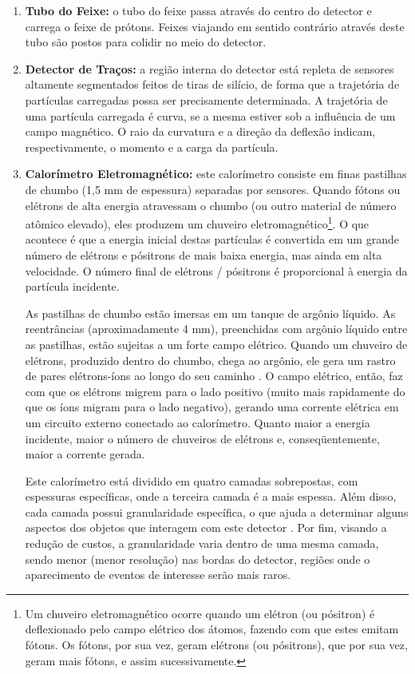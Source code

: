 \begin{enumerate}

\item \textbf{Tubo do Feixe:} o tubo do feixe passa através do centro do detector e carrega o feixe de prótons. Feixes viajando em sentido contrário através deste tubo são postos para colidir no meio do detector.

\item \textbf{Detector de Traços:} a região interna do detector está repleta de sensores altamente segmentados feitos de tiras de silício, de forma que a trajetória de partículas carregadas possa ser precisamente determinada. A trajetória de uma partícula carregada é curva, se a mesma estiver sob a influência de um campo magnético. O raio da curvatura e a direção da deflexão indicam, respectivamente, o momento e a carga da partícula.

\item \textbf{Calorímetro Eletromagnético:} este calorímetro consiste em finas pastilhas de chumbo (1,5 mm de espessura) separadas por sensores. Quando fótons ou elétrons de alta energia atravessam o chumbo (ou outro material de número atômico elevado), eles produzem um chuveiro eletromagnético\footnote{Um chuveiro eletromagnético ocorre quando um elétron (ou pósitron) é deflexionado pelo campo elétrico dos átomos, fazendo com que estes emitam fótons. Os fótons, por sua vez, geram elétrons (ou pósitrons), que por sua vez, geram mais fótons, e assim sucessivamente.}. O que acontece é que a energia inicial destas partículas é convertida em um grande número de elétrons e pósitrons de mais baixa energia, mas ainda em alta velocidade. O número final de elétrons / pósitrons é proporcional à energia da partícula incidente. 

As pastilhas de chumbo estão imersas em um tanque de argônio líquido. As reentrâncias (aproximadamente 4 mm), preenchidas com argônio líquido entre as pastilhas, estão sujeitas a um forte campo elétrico. Quando um chuveiro de elétrons, produzido dentro do chumbo, chega ao argônio, ele gera um rastro de pares elétrons-íons ao longo do seu caminho \cite{bib:knoll_radiation_detection}. O campo elétrico, então, faz com que os elétrons migrem para o lado positivo (muito mais rapidamente do que os íons migram para o lado negativo), gerando uma corrente elétrica em um circuito externo conectado ao calorímetro. Quanto maior a energia incidente, maior o número de chuveiros de elétrons e, conseqüentemente, maior a corrente gerada.

Este calorímetro está dividido em quatro camadas sobrepostas, com espessuras específicas, onde a terceira camada é a mais espessa. Além disso, cada camada possui granularidade específica, o que ajuda a determinar alguns aspectos dos objetos que interagem com este detector \cite{bib:msc_rabello}. Por fim, visando a redução de custos, a granularidade varia dentro de uma mesma camada, sendo menor (menor resolução) nas bordas do detector, regiões onde o aparecimento de eventos de interesse serão mais raros.


\end{enumerate}
